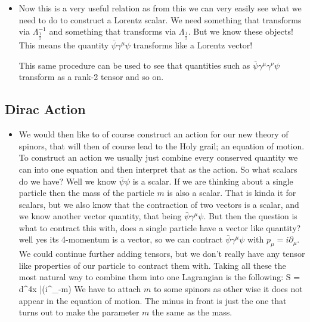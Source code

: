 \documentclass[11pt]{article}
\renewenvironment{flalign}{\vspace{-2mm}\empheq[box=\tcbhighmath]{align}}{\endempheq}
\numberwithin{equation}{section}
\begin{document}
\begin{itemize}
   \item 
   Now this is a very useful relation as from this we can very easily see what we need to do to construct a Lorentz scalar. We need something that transforms via $\Lambda_{\frac{1}{2}}^{-1}$ and something that transforms via $\Lambda_{\frac{1}{2}}$. But we know these objects! This means the quantity $\bar{\psi}\gamma^{\mu}\psi$ transforms like a Lorentz vector! 

   This same procedure can be used to see that quantities such as $\bar{\psi}\gamma^{\mu}\gamma^{\nu}\psi$ transform as a rank-2 tensor and so on. 
\end{itemize}
\subsection{Dirac Action}
\begin{itemize}
  \item We would then like to of course construct an action for our new theory of spinors, that will then of course lead to the Holy grail; an equation of motion. To construct an action we usually just combine every conserved quantity we can into one equation and then interpret that as the action. So what scalars do we have? Well we know $\bar{\psi}\psi$ is a scalar. If we are thinking about a single particle then the mass of the particle $m$ is also a scalar. That is kinda it for scalars, but we also know that the contraction of two vectors is a scalar, and we know another vector quantity, that being $\bar{\psi}\gamma^{\mu}\psi$. But then the question is what to contract this with, does a single particle have a vector like quantity? well yes its 4-momentum is a vector, so we can contract $\bar{\psi}\gamma^{\mu}\psi$ with $p_{\mu} = i\partial_{\mu}$. We could continue further adding tensors, but we don't really have any tensor like properties of our particle to contract them with. Taking all these the most natural way to combine them into one Lagrangian is the following:
  \begin{flalign}
  \label{D_act}
    S = \int d^4x \bar{\psi}(i\gamma^{\mu}\partial_{\mu}-m)\psi 
  \end{flalign}
  We have to attach $m$ to some spinors as other wise it does not appear in the equation of motion. The minus in front is just the one that turns out to make the parameter $m$ the same as the mass. 
  

\end{itemize}
\end{document}
